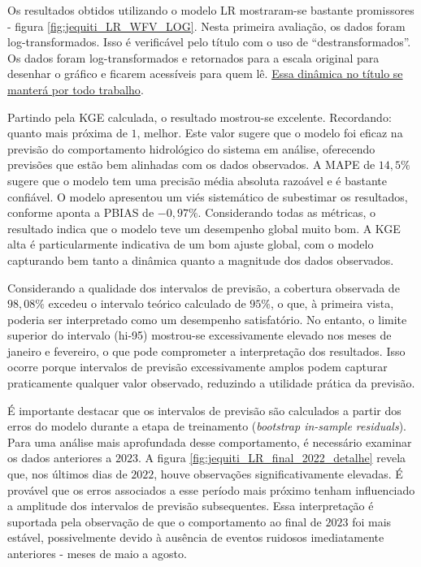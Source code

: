 Os resultados obtidos utilizando o modelo LR mostraram-se bastante promissores - figura \ref{fig:jequiti_LR_WFV_LOG}. Nesta primeira avaliação, os dados foram log-transformados. Isso é verificável pelo título com o uso de ``destransformados''. Os dados foram log-transformados e retornados para a escala original para desenhar o gráfico e ficarem acessíveis para quem lê. \underline{Essa dinâmica no título se manterá por todo trabalho}.

Partindo pela KGE calculada, o resultado mostrou-se excelente. Recordando: quanto mais próxima de $1$, melhor. Este valor sugere que o modelo foi eficaz na previsão do comportamento hidrológico do sistema em análise, oferecendo previsões que estão bem alinhadas com os dados observados. A MAPE de $14,5\%$ sugere que o modelo tem uma precisão média absoluta razoável e é bastante confiável. O modelo apresentou um viés sistemático de subestimar os resultados, conforme aponta a PBIAS de $-0,97\%$. Considerando todas as métricas, o resultado indica que o modelo teve um desempenho global muito bom. A KGE alta é particularmente indicativa de um bom ajuste global, com o modelo capturando bem tanto a dinâmica quanto a magnitude dos dados observados.

Considerando a qualidade dos intervalos de previsão, a cobertura observada de $98,08\%$ excedeu o intervalo teórico calculado de $95\%$, o que, à primeira vista, poderia ser interpretado como um desempenho satisfatório. No entanto, o limite superior do intervalo (hi-95) mostrou-se excessivamente elevado nos meses de janeiro e fevereiro, o que pode comprometer a interpretação dos resultados. Isso ocorre porque intervalos de previsão excessivamente amplos podem capturar praticamente qualquer valor observado, reduzindo a utilidade prática da previsão.

É importante destacar que os intervalos de previsão são calculados a partir dos erros do modelo durante a etapa de treinamento (\textit{bootstrap in-sample residuals}). Para uma análise mais aprofundada desse comportamento, é necessário examinar os dados anteriores a $2023$. A figura \ref{fig:jequiti_LR_final_2022_detalhe} revela que, nos últimos dias de $2022$, houve observações significativamente elevadas. É provável que os erros associados a esse período mais próximo tenham influenciado a amplitude dos intervalos de previsão subsequentes. Essa interpretação é suportada pela observação de que o comportamento ao final de $2023$ foi mais estável, possivelmente devido à ausência de eventos ruidosos imediatamente anteriores - meses de maio a agosto.

